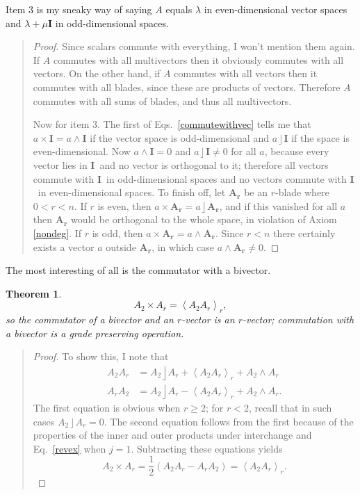 \documentclass{utarticle}
\newcommand{\bl}[1]{\ensuremath{\bm{#1}}}
\newcommand{\I}{\bl{I}}
\DeclareMathOperator{\lin}{\rfloor}
\DeclareMathOperator{\out}{\wedge}
\newcommand{\commute}[2]{\ensuremath{#1 \times #2}}
\newcommand{\grade}[2][]{\ensuremath{\left\langle #2 \right\rangle_{#1}}}
\newcommand{\half}{\ensuremath{\frac{1}{2}}}
\newtheorem{thm}{Theorem}
\newcommand{\bp}{\begin{quotation} \begin{proof}}
\newcommand{\ep}{\end{proof} \end{quotation}}
\begin{document}
Item $3$ is my sneaky way of saying $A$ equals $\lambda$ in even-dimensional vector 
spaces and $\lambda + \mu\I$ in odd-dimensional spaces. 
\bp
Since scalars commute with everything, I won't mention them again.  If $A$ commutes with all
multivectors then it obviously commutes with all vectors.  On the other hand, if $A$ commutes
with all vectors then it commutes with all blades, since these are products of vectors.  Therefore
$A$ commutes with all sums of blades, and thus all multivectors.

Now for item $3$.  The first of Eqs.~\eqref{commutewithvec} tells me that $\commute{a}{\I} = 
a \out \I$ if the vector space is odd-dimensional and $a \lin \I$ if the space is even-dimensional.  
Now $a \out \I = 0$ and $a \lin \I \neq 0$ for all $a$, because every vector lies in \I\ and 
no vector is orthogonal to it; therefore all vectors commute with \I\ in odd-dimensional spaces and 
no vectors commute with \I\ in even-dimensional spaces.  To finish off, let \bl{A_r} be an $r$-blade 
where $0 < r < n$.  If $r$ is even, then $\commute{a}{\bl{A_r}} = a \lin \bl{A_r}$, and if this 
vanished for all $a$ then \bl{A_r} would be orthogonal to the whole space, in violation of 
Axiom \ref{nondeg}.  If $r$ is odd, then $\commute{a}{\bl{A_r}} = a \out \bl{A_r}$.  Since 
$r < n$ there certainly exists a vector $a$ outside \bl{A_r}, in which case 
$a \out \bl{A_r} \neq 0$.
\ep

The most interesting of all is the commutator with a bivector.
\begin{thm}
\begin{equation}
\commute{A_2}{A_r} = \grade[r]{A_2 A_r},
\end{equation}
so the commutator of a bivector and an $r$-vector is an $r$-vector; commutation 
with a bivector is a grade preserving operation.  
\end{thm}
\bp
To show this, I note that
\begin{align}
A_2 A_r & = A_2 \lin A_r + \grade[r]{A_2 A_r} + A_2 \out A_r \nonumber \\
A_r A_2 & = A_2 \lin A_r - \grade[r]{A_2 A_r} + A_2 \out A_r.
\end{align}
The first equation is obvious when $r \geq 2$; for $r<2$, recall that in such
cases $A_2 \lin A_r = 0$.  The second equation follows from the first because 
of the properties of the inner and outer products under interchange and 
Eq.~\eqref{revex} when $j=1$.  Subtracting these equations yields
\begin{equation}
\commute{A_2}{A_r} = \half(A_2 A_r - A_r A_2) = \grade[r]{A_2 A_r}.
\end{equation}
\ep
\end{document}
